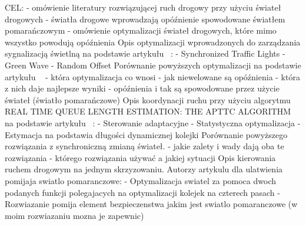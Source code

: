 CEL:
\newline
- omówienie literatury rozwiązującej ruch drogowy przy użyciu świateł drogowych
\newline
- światła drogowe wprowadzają opóźnienie spowodowane światłem pomarańczowym
\newline
- omówienie optymalizacji świateł drogowych, które mimo wszystko powodują opóźnienia
\newline
\newline
Opis optymalizacji wprowadzonych do zarządzania sygnalizacją świetlną na podstawie artykułu ~\cite{brockfeld2001optimizing}:
  \newline
  - Synchronized Traffic Lights
  \newline
  - Green Wave
  \newline
  - Random Offset
\newline
\newline
Porównanie powyższych optymalizacji na podstawie artykułu ~\cite{brockfeld2001optimizing}
\newline
- która optymalizacja co wnosi
\newline
- jak niewelowane są opóźnienia
\newline
- która z nich daje najlepsze wyniki
\newline
- opóźnienia i tak są spowodowane przez użycie świateł (światło pomarańczowe)
\newline
\newline
Opis koordynacji ruchu przy użyciu algorytmu REAL TIME QUEUE LENGTH ESTIMATION: THE APTTC ALGORITHM na podstawie artykułu ~\cite{athmaraman2005adaptive}:
  \newline
  - Sterowanie adaptacyjne
  \newline
  - Statystyczna optymalizacja
  \newline
  - Estymacja na podstawia długości dynamicznej kolejki
  \newline
\newline
Porównanie powyższego rozwiązania z synchroniczną zmianą świateł.
\newline
- jakie zalety i wady dają oba te rozwiązania
\newline
- którego rozwiązania używać a jakiej sytuacji
\newline
\newline
Opis kierowania ruchem drogowym na jednym skrzyzowaniu. Autorzy artykulu \cite{de1998optimal} dla ulatwienia pomijaja swiatlo pomaranczowe:
  \newline
  - Optymalizacja swiatel za pomoca dwoch podanych funkcji polegajacych na optymalizacji kolejek na czterech pasach
  \newline
  - Rozwiazanie pomija element bezpieczenstwa jakim jest swiatlo pomaranczowe (w moim rozwiazaniu mozna je zapewnic)


